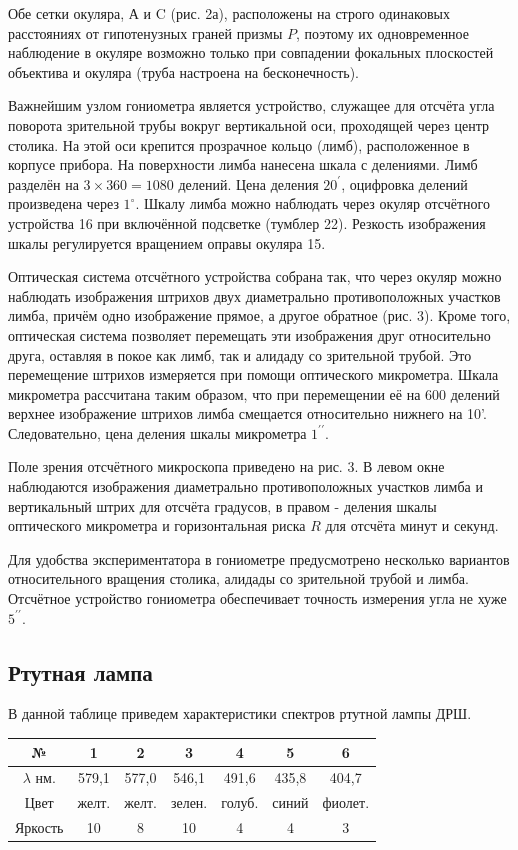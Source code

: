 \documentclass[a4paper,12pt]{article} %
\begin{document}
Обе сетки окуляра, А и C (рис. 2а), расположены на строго одинаковых расстояниях от гипотенузных граней призмы $P$, поэтому их одновременное наблюдение в окуляре возможно только при совпадении фокальных плоскостей объектива и окуляра (труба настроена на бесконечность).

Важнейшим узлом гониометра является устройство, служащее для отсчёта угла поворота зрительной трубы вокруг вертикальной оси, проходящей через центр столика. На этой оси крепится прозрачное кольцо (лимб), расположенное в корпусе прибора. На поверхности лимба нанесена шкала с делениями. Лимб разделён на $3 \times 360=1080$ делений. Цена деления $20^{\prime}$, оцифровка делений произведена через $1^{\circ}$. Шкалу лимба можно наблюдать через окуляр отсчётного устройства 16 при включённой подсветке (тумблер 22). Резкость изображения шкалы регулируется вращением оправы окуляра 15.

Оптическая система отсчётного устройства собрана так, что через окуляр можно наблюдать изображения штрихов двух диаметрально противоположных участков лимба, причём одно изображение прямое, а другое обратное (рис. 3). Кроме того, оптическая система позволяет перемещать эти изображения друг относительно друга, оставляя в покое как лимб, так и алидаду со зрительной трубой. Это перемещение штрихов измеряется при помощи оптического микрометра. Шкала микрометра рассчитана таким образом, что при перемещении её на 600 делений верхнее изображение штрихов лимба смещается относительно нижнего на 10'. Следовательно, цена деления шкалы микрометра $1^{\prime \prime}$.

Поле зрения отсчётного микроскопа приведено на рис. 3. В левом окне наблюдаются изображения диаметрально противоположных участков лимба и вертикальный штрих для отсчёта градусов, в правом - деления шкалы оптического микрометра и горизонтальная риска $R$ для отсчёта минут и секунд.

Для удобства экспериментатора в гониометре предусмотрено несколько вариантов относительного вращения столика, алидады со зрительной трубой и лимба.
Отсчётное устройство гониометра обеспечивает точность измерения угла не хуже $5^{\prime \prime}$.

\subsection{Ртутная лампа}
В данной таблице приведем характеристики спектров ртутной лампы ДРШ.
\begin{center}
\begin{tabular}{|c|c|c|c|c|c|c|}
\hline
№ & 1 & 2 & 3 & 4 & 5 & 6 \\
\hline
$\lambda$ нм.& 579,1 & 577,0 & 546,1 & 491,6 & 435,8 & 404,7 \\
\hline
Цвет & желт. & желт. & зелен. & голуб. & синий & фиолет. \\
\hline
Яркость& 10 & 8 & 10 & 4 & 4 & 3 \\
\hline
\end{tabular}
\end{center}
\end{document}
